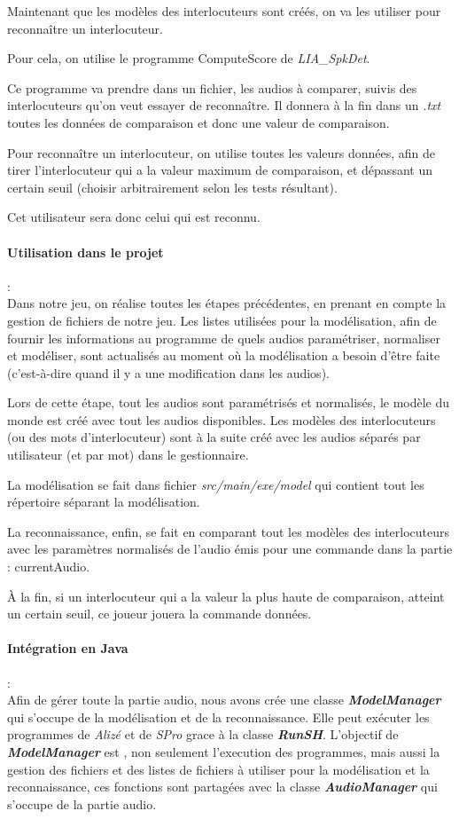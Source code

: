 Maintenant que les modèles des interlocuteurs sont créés, on va les utiliser pour reconnaître un interlocuteur.

Pour cela, on utilise le programme ComputeScore de \textit{LIA\_SpkDet}.

Ce programme va prendre dans un fichier, les audios à comparer, suivis des interlocuteurs qu'on veut essayer de reconnaître. Il donnera à la fin dans un \textit{.txt} toutes les données de comparaison et donc une valeur de comparaison.

Pour reconnaître un interlocuteur, on utilise toutes les valeurs données, afin de tirer l'interlocuteur qui a la valeur maximum de comparaison, et dépassant
un certain seuil (choisir arbitrairement selon les tests résultant).

Cet utilisateur sera donc celui qui est reconnu.


\paragraph*{Utilisation dans le projet} : \\
Dans notre jeu, on réalise toutes les étapes précédentes, en prenant en compte la gestion de fichiers de notre jeu. Les listes utilisées pour la modélisation,
afin de fournir les informations au programme de quels audios paramétriser, normaliser et modéliser, sont actualisés au moment où la modélisation a besoin
d'être faite (c'est-à-dire quand il y a une modification dans les audios).

Lors de cette étape, tout les audios sont paramétrisés et normalisés, le modèle du monde est créé avec tout les audios disponibles.
Les modèles des interlocuteurs (ou des mots d'interlocuteur) sont à la suite créé avec les audios séparés par utilisateur (et par mot) dans le gestionnaire.

La modélisation se fait dans fichier \textit{ src/main/exe/model} qui contient tout les répertoire séparant la modélisation.

La reconnaissance, enfin, se fait en comparant tout les modèles des interlocuteurs avec les paramètres normalisés de l'audio émis pour une commande dans la partie : currentAudio.

À la fin, si un interlocuteur qui a la valeur la plus haute de comparaison, atteint un certain seuil, ce joueur jouera la commande données.


\paragraph*{Intégration en Java} : \\
Afin de gérer toute la partie audio, nous avons crée une classe \textbf{\textit{ModelManager}} qui s'occupe de la modélisation et de la reconnaissance. Elle peut exécuter les programmes de \textit{Alizé} et de \textit{SPro} grace à la classe \textbf{\textit{RunSH}}. L'objectif de \textbf{\textit{ModelManager}} est , non seulement l'execution des programmes, mais aussi la gestion des fichiers et des listes de fichiers à utiliser pour la modélisation et la reconnaissance, ces fonctions sont partagées avec la classe \textbf{\textit{AudioManager}} qui s'occupe de la partie audio.

